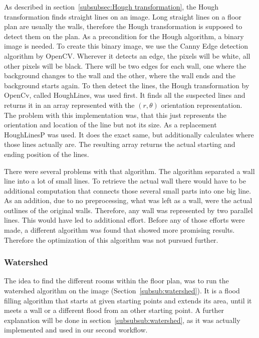 As described in section~\ref{subsubsec:Hough transformation}, the Hough transformation finds straight lines on an image. Long straight lines on a floor plan are usually the walls, therefore the Hough transformation is supposed to detect them on the plan. As a precondition for the Hough algorithm, a binary image is needed. To create this binary image, we use the Canny Edge detection algorithm by OpenCV. Wherever it detects an edge, the pixels will be white, all other pixels will be black. There will be two edges for each wall, one where the background changes to the wall and the other, where the wall ends and the background starts again. To then detect the lines, the Hough transformation by OpenCv, called HoughLines, was used first. It finds all the suspected lines and returns it in an array represented with the $(r,\theta)$ orientation representation. The problem with this implementation was, that this just represents the orientation and location of the line but not its size.
As a replacement HoughLinesP was used. It does the exact same, but additionally calculates where those lines actually are. The resulting array returns the actual starting and ending position of the lines. 

There were several problems with that algorithm. The algorithm separated a wall line into a lot of small lines. To retrieve the actual wall there would have to be additional computation that connects those several small parts into one big line. As an addition, due to no preprocessing, what was left as a wall, were the actual outlines of the original walls. Therefore, any wall was represented by two parallel lines. This would have led to additional effort. Before any of those efforts were made, a different algorithm was found that showed more promising results. Therefore the optimization of this algorithm was not pursued further.

  
\subsubsection{Watershed}
The idea to find the different rooms within the floor plan, was to run the watershed algorithm on the image (Section~\ref{subsub:watershed}). It is a flood filling algorithm that starts at given starting points and extends its area, until it meets a wall or a different flood from an other starting point. A further explanation will be done in section~\ref{subsubsub:watershed}, as it was actually implemented and used in our second workflow.


